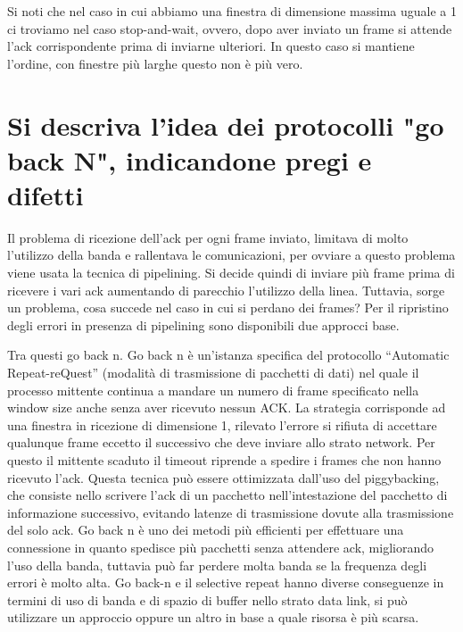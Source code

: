 Si noti che nel caso in cui abbiamo una finestra di dimensione massima uguale a 1 ci troviamo nel caso stop-and-wait, ovvero, dopo aver inviato un frame si attende l’ack corrispondente prima di inviarne ulteriori. In questo caso si mantiene l’ordine, con finestre più larghe questo non è più vero.

\section{Si descriva l'idea dei protocolli "go back N", indicandone pregi e difetti}

Il problema di ricezione dell’ack per ogni frame inviato, limitava di molto l’utilizzo della banda e rallentava le comunicazioni, per ovviare a questo problema viene usata la tecnica di pipelining. Si decide quindi di inviare più frame prima di ricevere i vari ack aumentando di parecchio l’utilizzo della linea. Tuttavia, sorge un problema, cosa succede nel caso in cui si perdano dei frames? Per il ripristino degli errori in presenza di pipelining sono disponibili due approcci base.

Tra questi go back n. Go back n è un’istanza specifica del protocollo “Automatic Repeat-reQuest” (modalità di trasmissione di pacchetti di dati) nel quale il processo mittente continua a mandare un numero di frame specificato nella window size anche senza aver ricevuto nessun ACK.
La strategia corrisponde ad una finestra in ricezione di dimensione 1, rilevato l’errore si rifiuta di accettare qualunque frame eccetto il successivo che deve inviare allo strato network. Per questo il mittente scaduto il timeout riprende a spedire i frames che non hanno ricevuto l’ack.
Questa tecnica può essere ottimizzata dall’uso del piggybacking, che consiste nello scrivere l’ack di un pacchetto nell’intestazione del pacchetto di informazione successivo, evitando latenze di trasmissione dovute alla trasmissione del solo ack.
Go back n è uno dei metodi più efficienti per effettuare una connessione in quanto spedisce più pacchetti senza attendere ack, migliorando l’uso della banda, tuttavia può far perdere molta banda se la frequenza degli errori è molto alta.
Go back-n e il selective repeat hanno diverse conseguenze in termini di uso di banda e di spazio di buffer nello strato data link, si può utilizzare un approccio oppure un altro in base a quale risorsa è più scarsa.

 
